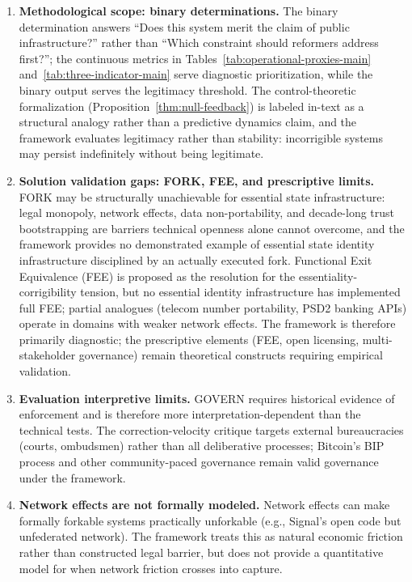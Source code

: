 \documentclass{article}
\begin{document}
\begin{enumerate}
    \item \textbf{Methodological scope: binary determinations.} The binary determination answers ``Does this system merit the claim of public infrastructure?'' rather than ``Which constraint should reformers address first?''; the continuous metrics in Tables~\ref{tab:operational-proxies-main} and~\ref{tab:three-indicator-main} serve diagnostic prioritization, while the binary output serves the legitimacy threshold. The control-theoretic formalization (Proposition~\ref{thm:null-feedback}) is labeled in-text as a structural analogy rather than a predictive dynamics claim, and the framework evaluates legitimacy rather than stability: incorrigible systems may persist indefinitely without being legitimate.

    \item \textbf{Solution validation gaps: FORK, FEE, and prescriptive limits.} FORK may be structurally unachievable for essential state infrastructure: legal monopoly, network effects, data non-portability, and decade-long trust bootstrapping are barriers technical openness alone cannot overcome, and the framework provides no demonstrated example of essential state identity infrastructure disciplined by an actually executed fork. Functional Exit Equivalence (FEE) is proposed as the resolution for the essentiality-corrigibility tension, but no essential identity infrastructure has implemented full FEE; partial analogues (telecom number portability, PSD2 banking APIs) operate in domains with weaker network effects. The framework is therefore primarily diagnostic; the prescriptive elements (FEE, open licensing, multi-stakeholder governance) remain theoretical constructs requiring empirical validation.

    \item \textbf{Evaluation interpretive limits.} GOVERN requires historical evidence of enforcement and is therefore more interpretation-dependent than the technical tests. The correction-velocity critique targets external bureaucracies (courts, ombudsmen) rather than all deliberative processes; Bitcoin's BIP process and other community-paced governance remain valid governance under the framework.

    \item \textbf{Network effects are not formally modeled.} Network effects can make formally forkable systems practically unforkable (e.g., Signal's open code but unfederated network). The framework treats this as natural economic friction rather than constructed legal barrier, but does not provide a quantitative model for when network friction crosses into capture.


\end{enumerate}
\end{document}
